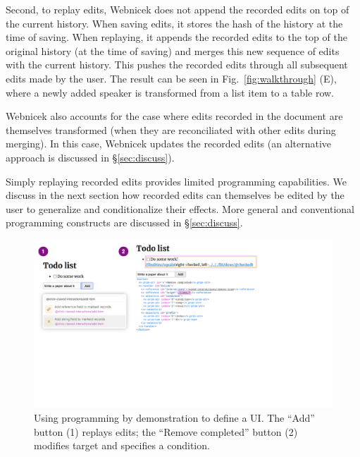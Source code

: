 \documentclass[sigconf,anonymous,screen]{acmart}
\begin{document}
Second, to replay edits, Webnicek does not append the recorded edits on top of the current history.
When saving edits, it stores the hash of the history at the time of saving. When replaying,
it appends the recorded edits to the top of the original history (at the time of saving) and merges
this new sequence of edits with the current history. This pushes the recorded edits through all
subsequent edits made by the user. The result can be seen in Fig.~\ref{fig:walkthrough} (E), where
a newly added speaker is transformed from a list item to a table row.

Webnicek also accounts for the case where edits recorded in the document are themselves
transformed (when they are reconciliated with other edits during merging). In this case, Webnicek
updates the recorded edits (an alternative approach is discussed in \S\ref{sec:discuss}).

Simply replaying recorded edits provides limited programming capabilities. We discuss in the next section how recorded edits can themselves be edited by the user to generalize and conditionalize their effects. More general and conventional programming constructs are discussed in \S\ref{sec:discuss}.


\begin{figure}[t]
\vspace{-0.5em}
\includegraphics[width=1\columnwidth,clip,trim=0.5cm 8.5cm 8.5cm 0.5cm]{fig/interactive.pdf}
\vspace{-1.25em}
\caption{Using programming by demonstration to define a UI. The ``Add'' button (1) replays edits;
the ``Remove completed'' button (2) modifies target and specifies a condition. }
\label{fig:interactive}
\vspace{-1em}
\end{figure}
\end{document}

